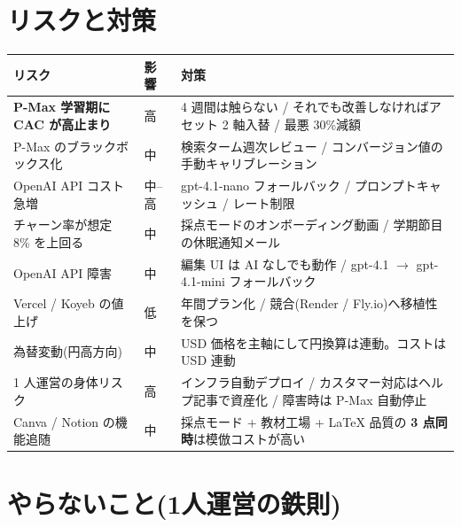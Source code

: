 \documentclass{article}
\newcommand{\hl}[1]{\textcolor{cAlert}{\textbf{#1}}}
\begin{document}
\section{リスクと対策}

\begin{center}
\small
\renewcommand{\arraystretch}{1.25}
\begin{tabular}{p{4.5cm}p{4cm}p{6.5cm}}
\toprule
\textbf{リスク} & \textbf{影響} & \textbf{対策} \\
\midrule
\hl{P-Max 学習期に CAC が高止まり} & 高 & 4 週間は触らない / それでも改善しなければアセット 2 軸入替 / 最悪 30\%減額 \\
\midrule
P-Max のブラックボックス化      & 中  & 検索ターム週次レビュー / コンバージョン値の手動キャリブレーション \\
\midrule
OpenAI API コスト急増           & 中--高 & gpt-4.1-nano フォールバック / プロンプトキャッシュ / レート制限 \\
\midrule
チャーン率が想定 8\% を上回る   & 中  & 採点モードのオンボーディング動画 / 学期節目の休眠通知メール \\
\midrule
OpenAI API 障害                 & 中  & 編集 UI は AI なしでも動作 / gpt-4.1 $\to$ gpt-4.1-mini フォールバック \\
\midrule
Vercel / Koyeb の値上げ         & 低  & 年間プラン化 / 競合(Render / Fly.io)へ移植性を保つ \\
\midrule
為替変動(円高方向)            & 中  & USD 価格を主軸にして円換算は連動。コストは USD 連動 \\
\midrule
1 人運営の身体リスク            & 高  & インフラ自動デプロイ / カスタマー対応はヘルプ記事で資産化 / 障害時は P-Max 自動停止 \\
\midrule
Canva / Notion の機能追随        & 中  & 採点モード + 教材工場 + LaTeX 品質の \textbf{3 点同時}は模倣コストが高い \\
\bottomrule
\end{tabular}
\end{center}

\section{やらないこと(1人運営の鉄則)}
\end{document}
